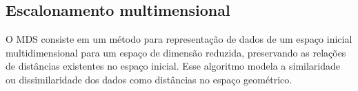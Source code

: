 \begin{comment}
 \begin{equation}\label{eq:PCA2}
 y_i = \sum\limits_{j = 1}^p a_{i,j}x_j = \mathbf{a_i}^T\mathbf{x}
 \end{equation}

Pode-se demonstrar que, para se obter $\mathbf{y}$ variáveis que não são correlacionadas,  deve-se atribuir aos vetores de coeficientes $\mathbf{a_1} \ldots \mathbf{a_p}$ os auto-vetores da matriz de covariância de $\mathbf{x}$, sendo esta última dada por: 

\begin{equation}\label{eq:PCA3}
\mathbf{\Sigma_x} = E{[\mathbf{xx}^T]}-E{[\mathbf{x}]}E{[\mathbf{x}^T]}
\end{equation}

\noindent aonde $E[.]$ denota o operador esperança. 
A dimensão da matriz de covariância $\mathbf{\Sigma_x}$ é  $p \times p$ e a ela estão associados $p$ autovetores ($\mathbf{a_1}\text{, }\mathbf{a_2}\text{, }\ldots\text{, }\mathbf{a_p}$) e $p$ autovalores ($\lambda_1 > \lambda_2 \ldots > \lambda_p$) correspondentes, sendo cada auto-valor $\lambda_i$ a variância de cada variável de saída $y_i$ obtida através da Equação \ref{eq:PCA2}. 

Selecionar dentre as componentes somente aquelas de maior variância, implica em construir a matriz de transformação apenas com os autovetores mais significativos. Dessa forma, é possível obter uma representação dos dados em um espaço de dimensão reduzida e de mais fácil entendimento do ponto de vista geométrico e espacial. Na Figura \ref{fig:nuvem_pca} temos representadas as projeções das duas componentes principais de maior variância para cada um dos descritores avaliados. Os valores numéricos correspondem a taxa de acerto média nos experimentos de recuperação de formas pelo conteúdo alcanças para cada classe de formas representada.
\end{comment}

\subsection{Escalonamento multimensional}

O \acf{MDS} \cite{cox:2000} consiste em um método para representação de dados de um espaço inicial multidimensional para um espaço de dimensão reduzida, preservando as relações de distâncias existentes no espaço inicial. Esse algoritmo modela a similaridade ou dissimilaridade dos dados como distâncias no espaço geométrico.


